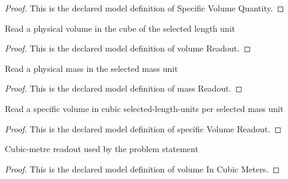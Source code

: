 \begin{proof}
  This is the declared model definition of Specific Volume Quantity.
\end{proof}
\begin{definition}
  \label{def:physics:phyx-mini-0397:phyxminiproblems-problemphyxmini0397-volumereadout}
  Read a physical volume in the cube of the selected length unit
\end{definition}
\begin{proof}
  This is the declared model definition of volume Readout.
\end{proof}
\begin{definition}
  \label{def:physics:phyx-mini-0397:phyxminiproblems-problemphyxmini0397-massreadout}
  Read a physical mass in the selected mass unit
\end{definition}
\begin{proof}
  This is the declared model definition of mass Readout.
\end{proof}
\begin{definition}
  \label{def:physics:phyx-mini-0397:phyxminiproblems-problemphyxmini0397-specificvolumereadout}
  Read a specific volume in cubic selected-length-units per selected mass unit
\end{definition}
\begin{proof}
  This is the declared model definition of specific Volume Readout.
\end{proof}
\begin{definition}
  \label{def:physics:phyx-mini-0397:phyxminiproblems-problemphyxmini0397-volumeincubicmeters}
  Cubic-metre readout used by the problem statement
\end{definition}
\begin{proof}
  This is the declared model definition of volume In Cubic Meters.
\end{proof}
